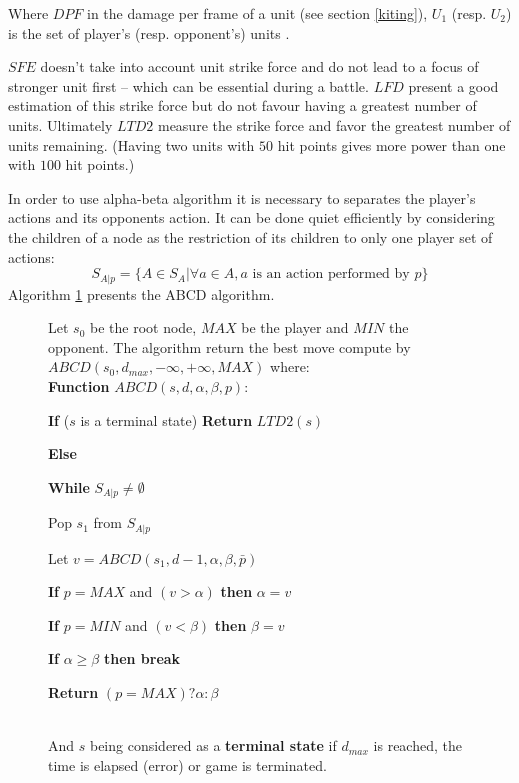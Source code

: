 Where $DPF$ in the damage per frame of a unit (see section \ref{kiting}), $U_1$ (resp. $U_2$) is the set of player's (resp. opponent's) units .

$SFE$ doesn't take into account unit strike force and do not lead to a focus of stronger unit first -- which can be essential during a battle. 
$LFD$ present a good estimation of this strike force but do not favour having a greatest number of units. 
Ultimately $LTD2$ measure the strike force and favor the greatest number of units remaining. 
(Having two units with $50$ hit points gives more power than one with $100$ hit points.)

In order to use alpha-beta algorithm it is necessary to separates the player's actions and its opponents action.
It can be done quiet efficiently by considering the children of a node as the restriction of its children to only one player set of actions:
$$
S_{A|p} = \{A \in S_A | \forall a \in A, a \text{ is an action performed by $p$}\}
$$
Algorithm \ref{algABCD} presents the ABCD algorithm.

\begin{figure}[h!t]
    \begin{algorithm}
        Let $s_0$ be the root node, $MAX$ be the player and $MIN$ the opponent. 
        The algorithm return the best move compute by $ABCD(s_0,d_{max},-\infty,+\infty,MAX)$ where: \ \\

        \textbf{Function} $ABCD(s,d,\alpha,\beta,p)$:
        \begin{enum}
        \item \textbf{If} ($s$ is a terminal state) \textbf{Return} $LTD2(s)$
        \item \textbf{Else}
            \begin{enum}
            \item \textbf{While} $S_{A|p} \neq \emptyset$
                \begin{enum}
                \item Pop $s_1$ from $S_{A|p}$ 
                \item Let $v = ABCD(s_1,d-1,\alpha,\beta,\bar{p})$
                \item \textbf{If} $p = MAX$ and $(v > \alpha)$ \textbf{then} $\alpha = v$
                \item \textbf{If} $p = MIN$ and $(v < \beta)$ \textbf{then} $\beta= v$
                \item \textbf{If} $\alpha \geq \beta$ \textbf{then break} 
                \end{enum}
            \end{enum}
        \item \textbf{Return} $(p = MAX) ? \alpha : \beta$ 
        \end{enum}
        \ \\
        And $s$ being considered as a \textbf{terminal state} if $d_{max}$ is reached, the time is elapsed (error) or game is terminated.
        \label{algABCD}
    \end{algorithm}
\end{figure}
